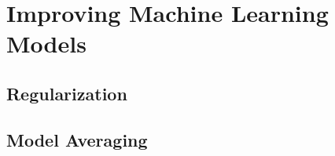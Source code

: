 

\section{Improving Machine Learning Models}

\subsection{Regularization}

\subsection{Model Averaging}





